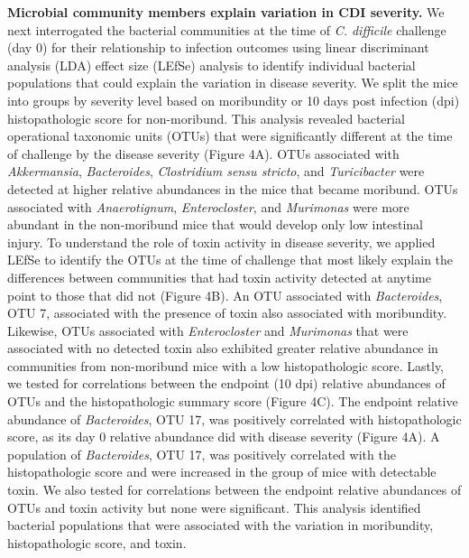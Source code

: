 \documentclass[
  12pt,
]{article}
\begin{document}
\textbf{Microbial community members explain variation in CDI severity.}
We next interrogated the bacterial communities at the time of \emph{C.
difficile} challenge (day 0) for their relationship to infection
outcomes using linear discriminant analysis (LDA) effect size (LEfSe)
analysis to identify individual bacterial populations that could explain
the variation in disease severity. We split the mice into groups by
severity level based on moribundity or 10 days post infection (dpi)
histopathologic score for non-moribund. This analysis revealed bacterial
operational taxonomic units (OTUs) that were significantly different at
the time of challenge by the disease severity (Figure 4A). OTUs
associated with \emph{Akkermansia}, \emph{Bacteroides},
\emph{Clostridium sensu stricto}, and \emph{Turicibacter} were detected
at higher relative abundances in the mice that became moribund. OTUs
associated with \emph{Anaerotignum}, \emph{Enterocloster}, and
\emph{Murimonas} were more abundant in the non-moribund mice that would
develop only low intestinal injury. To understand the role of toxin
activity in disease severity, we applied LEfSe to identify the OTUs at
the time of challenge that most likely explain the differences between
communities that had toxin activity detected at anytime point to those
that did not (Figure 4B). An OTU associated with \emph{Bacteroides}, OTU
7, associated with the presence of toxin also associated with
moribundity. Likewise, OTUs associated with \emph{Enterocloster} and
\emph{Murimonas} that were associated with no detected toxin also
exhibited greater relative abundance in communities from non-moribund
mice with a low histopathologic score. Lastly, we tested for
correlations between the endpoint (10 dpi) relative abundances of OTUs
and the histopathologic summary score (Figure 4C). The endpoint relative
abundance of \emph{Bacteroides}, OTU 17, was positively correlated with
histopathologic score, as its day 0 relative abundance did with disease
severity (Figure 4A). A population of \emph{Bacteroides}, OTU 17, was
positively correlated with the histopathologic score and were increased
in the group of mice with detectable toxin. We also tested for
correlations between the endpoint relative abundances of OTUs and toxin
activity but none were significant. This analysis identified bacterial
populations that were associated with the variation in moribundity,
histopathologic score, and toxin.
\end{document}
